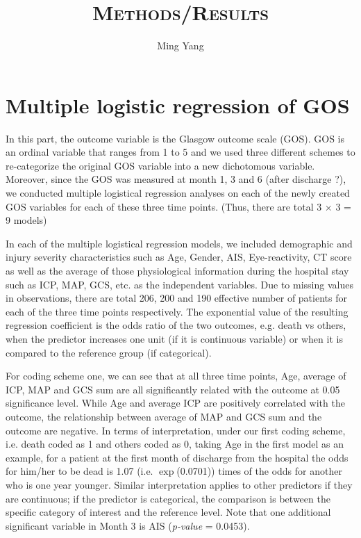 \documentclass{article}
\begin{document}
\title{\textsc{Methods/Results}}
\author{Ming Yang}
\date{}
\maketitle

\tableofcontents
\newpage


\section{Multiple logistic regression of GOS} 
In this part, the outcome variable is the Glasgow outcome scale (GOS). GOS is an ordinal variable that ranges from 1 to 5 and we used three different schemes to re-categorize the original GOS variable into a new dichotomous variable. Moreover, since the GOS was measured at month 1, 3 and 6 (after discharge ?), we conducted multiple logistical regression analyses on each of the newly created GOS variables for each of these three time points. (Thus, there are total 3 $\times$ 3 = 9 models)

In each of the multiple logistical regression models, we included demographic and injury severity characteristics such as Age, Gender, AIS, Eye-reactivity, CT score as well as the average of those physiological information during the hospital stay such as ICP, MAP, GCS, etc. as the independent variables. Due to missing values in observations, there are total 206, 200 and 190 effective number of patients for each of the three time points respectively. The exponential value of the resulting regression coefficient is the odds ratio of the two outcomes, e.g. death vs others, when the predictor increases one unit (if it is continuous variable) or when it is compared to the reference group (if categorical).

For coding scheme one, we can see that at all three time points, Age, average of ICP, MAP and GCS sum are all significantly related with the outcome at 0.05 significance level. While Age and average ICP are positively correlated with the outcome, the relationship between average of MAP and GCS sum and the outcome are negative. In terms of interpretation, under our first coding scheme, i.e. death coded as 1 and others coded as 0, taking Age in the first model as an example, for a patient at the first month of discharge from the hospital the odds for him/her to be dead is 1.07 (i.e. $\exp$(0.0701)) times of the odds for another who is one year younger. Similar interpretation applies to other predictors if they are continuous; if the predictor is categorical, the comparison is between the specific category of interest and the reference level. Note that one additional significant variable in Month 3 is AIS (\emph{p-value} = 0.0453).
\end{document}
